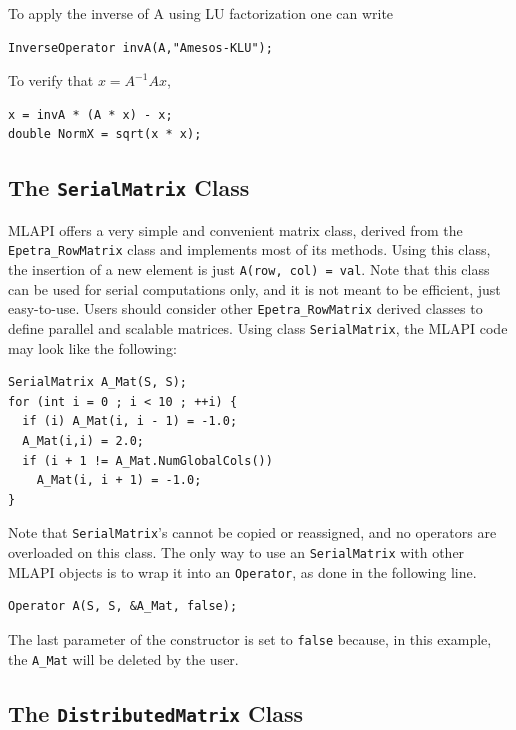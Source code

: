 \documentclass{article}[11pt]
\newcommand{\MLAPI}  {{\sc MLAPI }}
\begin{document}
To apply the inverse of A using LU factorization one can write
\begin{verbatim}
InverseOperator invA(A,"Amesos-KLU");
\end{verbatim}
To verify that $x = A^{-1} A x$,
\begin{verbatim}
x = invA * (A * x) - x;
double NormX = sqrt(x * x);
\end{verbatim}

\subsection{The {\tt SerialMatrix} Class}
\label{sec:serialmatrix}

\MLAPI offers a very simple and convenient matrix class, derived from
 the \verb!Epetra_RowMatrix! class and implements most of its methods. 
 Using this class, the insertion of a new
 element is just \verb!A(row, col) = val!. Note that this class
can be used for serial computations only, and it is not meant to be efficient,
just easy-to-use. Users should consider
other \verb!Epetra_RowMatrix! derived classes
to define parallel and scalable matrices. Using class {\tt SerialMatrix}, the \MLAPI
code may look like the following:
\begin{verbatim}
SerialMatrix A_Mat(S, S);
for (int i = 0 ; i < 10 ; ++i) {
  if (i) A_Mat(i, i - 1) = -1.0;
  A_Mat(i,i) = 2.0;
  if (i + 1 != A_Mat.NumGlobalCols())
    A_Mat(i, i + 1) = -1.0;
}
\end{verbatim}
Note that {\tt SerialMatrix}'s cannot be copied or reassigned, and no
operators are overloaded on this class. The only way to use an
{\tt SerialMatrix} with other \MLAPI objects is to wrap it into an
{\tt Operator}, as done in the following line.
\begin{verbatim}
Operator A(S, S, &A_Mat, false);
\end{verbatim}
The last parameter of the constructor is set to {\tt false} because, in
this example, the
\verb!A_Mat! will be deleted by the user.

\subsection{The {\tt DistributedMatrix} Class}
\label{sec:distributedmatrix}
\end{document}
